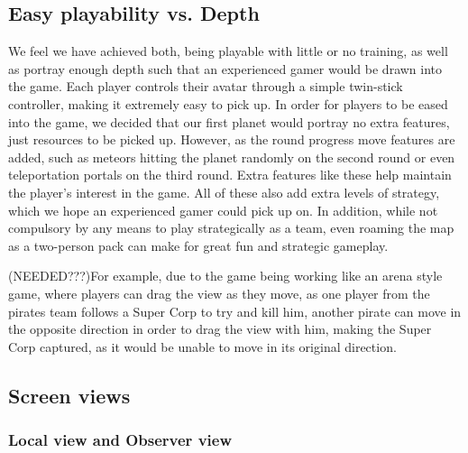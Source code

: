 \documentclass[11pt,a4paper]{article}
\begin{document}
      \subsection{Easy playability vs. Depth}
      We feel we have achieved both, being playable with little or no training, as well as portray enough depth such that an experienced gamer would be drawn into the game. Each player controls their avatar through a simple twin-stick controller, making it extremely easy to pick up. In order for players to be eased into the game, we decided that our first planet would portray no extra features, just resources to be picked up. However, as the round progress move features are added, such as meteors hitting the planet randomly on the second round or even teleportation portals on the third round. Extra features like these help maintain the player's interest in the game. All of these also add extra levels of strategy, which we hope an experienced gamer could pick up on. In addition, while not compulsory by any means to play strategically as a team, even roaming the map as a two-person pack can make for great fun and strategic gameplay. 
      
      (NEEDED???)For example, due to the game being working like an arena style game, where players can drag the view as they move, as one player from the pirates team follows a Super Corp to try and kill him, another pirate can move in the opposite direction in order to drag the view with him, making the Super Corp captured, as it would be unable to move in its original direction. 


  \subsection{Screen views}


   \subsubsection{Local view and Observer view}
\end{document}
